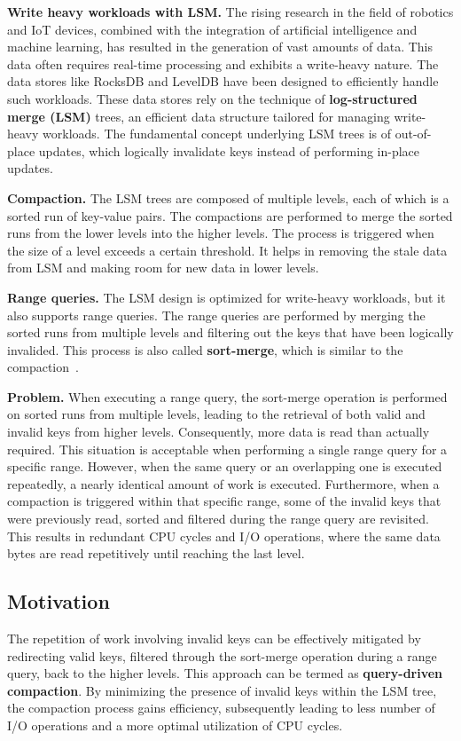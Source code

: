 \textbf{Write heavy workloads with LSM.} The rising research in the field of robotics and IoT devices, combined with the 
integration of artificial intelligence and machine learning, has resulted in the generation of vast amounts of data.
This data often requires real-time processing and exhibits a write-heavy nature. The data stores like RocksDB and 
LevelDB have been designed to efficiently handle such workloads. These data stores rely on the technique of
\textbf{log-structured merge (LSM)} trees, an efficient data structure tailored for managing write-heavy workloads. The
fundamental concept underlying LSM trees is of out-of-place updates, which logically invalidate keys instead of 
performing in-place updates.

\textbf{Compaction.} The LSM trees are composed of multiple levels, each of which is a sorted run of key-value pairs. 
The compactions are performed to merge the sorted runs from the lower levels into the higher levels. The process is 
triggered when the size of a level exceeds a certain threshold. It helps in removing the stale data from LSM and 
making room for new data in lower levels.

\textbf{Range queries.} The LSM design is optimized for write-heavy workloads, but it also supports range queries. The
range queries are performed by merging the sorted runs from multiple levels and filtering out the keys that have been
logically invalided. This process is also called \textbf{sort-merge}, which is similar to the compaction~\cite{Sarkar2021}.

\textbf{Problem.} When executing a range query, the sort-merge operation is performed on sorted runs from multiple 
levels, leading to the retrieval of both valid and invalid keys from higher levels. Consequently, more data is read than 
actually required. This situation is acceptable when performing a single range query for a specific range. However, when 
the same query or an overlapping one is executed repeatedly, a nearly identical amount of work is executed. Furthermore, 
when a compaction is triggered within that specific range, some of the invalid keys that were previously read, sorted 
and filtered during the range query are revisited. This results in redundant CPU cycles and I/O operations, where the 
same data bytes are read repetitively until reaching the last level.


\subsection{Motivation}
The repetition of work involving invalid keys can be effectively mitigated by redirecting valid keys, filtered through 
the sort-merge operation during a range query, back to the higher levels. This approach can be termed as 
\textbf{query-driven compaction}. By minimizing the presence of invalid keys within the LSM tree, the compaction process 
gains efficiency, subsequently leading to less number of I/O operations and a more optimal utilization of CPU cycles.


